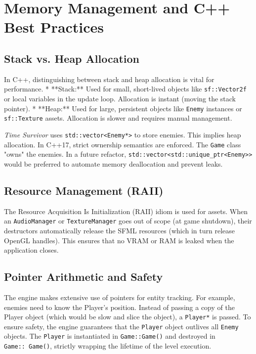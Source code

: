\documentclass[10pt, a4paper]{article}
\begin{document}
\newpage

\section{Memory Management and C++ Best Practices}

\subsection{Stack vs. Heap Allocation}
In C++, distinguishing between stack and heap allocation is vital for performance.
* **Stack:** Used for small, short-lived objects like \texttt{sf::Vector2f} or local variables in the update loop. Allocation is instant (moving the stack pointer).
* **Heap:** Used for large, persistent objects like \texttt{Enemy} instances or \texttt{sf::Texture} assets. Allocation is slower and requires manual management.

\textit{Time Survivor} uses \texttt{std::vector<Enemy*>} to store enemies. This implies heap allocation. In C++17, strict ownership semantics are enforced. The \texttt{Game} class "owns" the enemies. In a future refactor, \texttt{std::vector<std::unique\_ptr<Enemy>>} would be preferred to automate memory deallocation and prevent leaks.

\subsection{Resource Management (RAII)}
The Resource Acquisition Is Initialization (RAII) idiom is used for assets. When an \texttt{AudioManager} or \texttt{TextureManager} goes out of scope (at game shutdown), their destructors automatically release the SFML resources (which in turn release OpenGL handles). This ensures that no VRAM or RAM is leaked when the application closes.

\subsection{Pointer Arithmetic and Safety}
The engine makes extensive use of pointers for entity tracking. For example, enemies need to know the Player's position. Instead of passing a copy of the Player object (which would be slow and slice the object), a \texttt{Player*} is passed.
To ensure safety, the engine guarantees that the \texttt{Player} object outlives all \texttt{Enemy} objects. The \texttt{Player} is instantiated in \texttt{Game::Game()} and destroyed in \texttt{Game::~Game()}, strictly wrapping the lifetime of the level execution.
\end{document}
